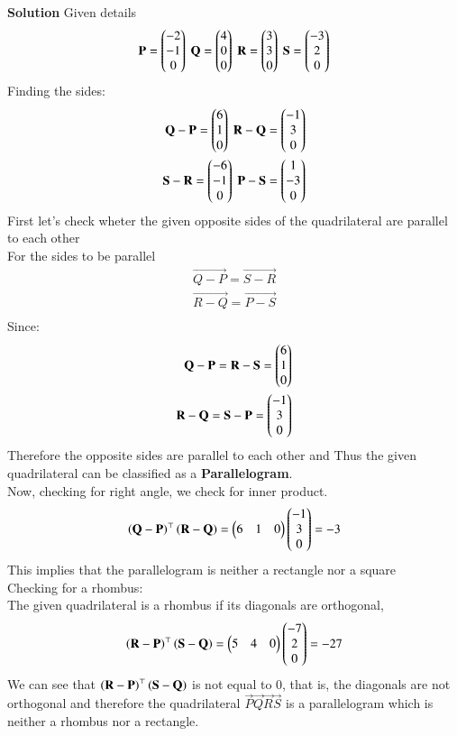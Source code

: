 \documentclass[journal]{IEEEtran}
\theoremstyle{remark}
\begin{document}
\textbf{Solution} Given details
\begin{align}
    \vec{P}=\myvec{-2\\-1\\0}\ \vec{Q}=\myvec{4\\0\\0}\ 
    \vec{R}=\myvec{3\\3\\0}\ 
    \vec{S}=\myvec{-3\\2\\0}
\end{align}
Finding the sides:
\begin{align}
\vec{Q}-\vec{P}=\myvec{6\\1\\0} \  \vec{R}-\vec{Q}=\myvec{-1\\3\\0} \\
\vec{S}-\vec{R}=\myvec{-6\\-1\\0} \ 
\vec{P}-\vec{S}=\myvec{1\\-3\\0}
\end{align}
First let's check wheter the given opposite sides of the quadrilateral are parallel to each other \\
For the sides to be parallel 
\begin{align}
    \vec{Q-P}=\vec{S-R}\\
    \vec{R-Q}=\vec{P-S}\\
\end{align}
Since:
\begin{align}
    \mathbf{Q-P}=\mathbf{R-S}=\begin{pmatrix}6\\1\\0\end{pmatrix}\\
    \mathbf{R-Q}=\mathbf{S-P}=\begin{pmatrix}-1\\3\\0\end{pmatrix}
\end{align}
Therefore the opposite sides are parallel to each other and Thus the given quadrilateral can be classified as a \textbf{Parallelogram}.\\
Now, checking for right angle, we check for inner product.
\begin{align}
 \left(\mathbf{Q}- \mathbf{P}\right)^{\top} \left(\mathbf{R}- \mathbf{Q}\right)=\begin{pmatrix}6 & 1&0\end{pmatrix}\begin{pmatrix}-1 \\3\\0\end{pmatrix}=-3
\end{align}
This implies that the parallelogram is neither a rectangle nor a square \\
Checking for a rhombus:\\
The given quadrilateral is a rhombus if its diagonals are orthogonal,
\begin{align}
\left(\mathbf{R}- \mathbf{P}\right)^{\top} \left(\mathbf{S}- \mathbf{Q}\right)=\begin{pmatrix}5 & 4&0\end{pmatrix}\begin{pmatrix}-7\\ 2\\0\end{pmatrix}=-27
\end{align}
We can see that $\left(\mathbf{R}- \mathbf{P}\right)^{\top} \left(\mathbf{S}- \mathbf{Q}\right)$ is not equal to $0$, that is, the diagonals are not orthogonal and therefore the quadrilateral $\vec{P}\vec{Q}\vec{R}\vec{S}$ is a parallelogram which is neither a rhombus nor a rectangle.\\
\end{document}
